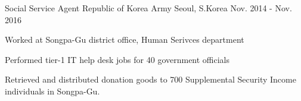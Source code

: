 

\begin{cventries}

  \cventry
    {Social Service Agent} %
    {Republic of Korea Army} %
    {Seoul, S.Korea} %
    {Nov. 2014 - Nov. 2016} %
    {
      \begin{cvitems} %
        \item {Worked at Songpa-Gu district office, Human Serivces department}
        \item {Performed tier-1 IT help desk jobs for 40 government officials}
        \item {Retrieved and distributed donation goods to 700 Supplemental Security Income individuals in Songpa-Gu.}
      \end{cvitems}
    }

\end{cventries}